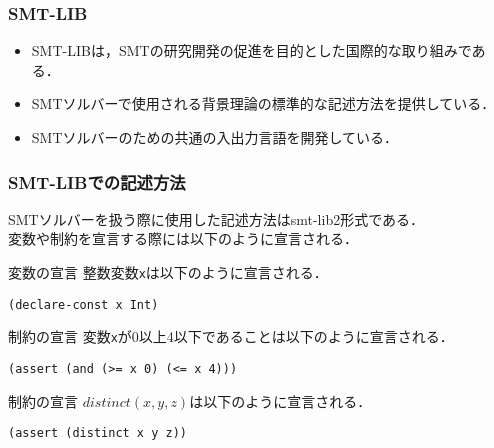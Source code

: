 \begin{frame}[fragile]\small
    \frametitle{SMT-LIB}
    \begin{itemize}
        \item SMT-LIBは，SMTの研究開発の促進を目的とした国際的な取り組みである．
        \item SMTソルバーで使用される背景理論の標準的な記述方法を提供している．
        \item SMTソルバーのための共通の入出力言語を開発している．
    \end{itemize}
\end{frame}

\begin{frame}[fragile]\small
    \frametitle{SMT-LIBでの記述方法}
    SMTソルバーを扱う際に使用した記述方法はsmt-lib2形式である．\\
    変数や制約を宣言する際には以下のように宣言される．
    \begin{exampleblock}{変数の宣言}
        整数変数\verb|x|は以下のように宣言される．
\begin{verbatim}
(declare-const x Int)
\end{verbatim}
    \end{exampleblock}
    \begin{exampleblock}{制約の宣言}
        変数\verb|x|が0以上4以下であることは以下のように宣言される．
\begin{verbatim}
(assert (and (>= x 0) (<= x 4)))
\end{verbatim}
    \end{exampleblock}
    \begin{exampleblock}{\distinct 制約の宣言}
        $distinct(x,y,z)$は以下のように宣言される．
\begin{verbatim}
(assert (distinct x y z))
\end{verbatim}
    \end{exampleblock}
\end{frame}

